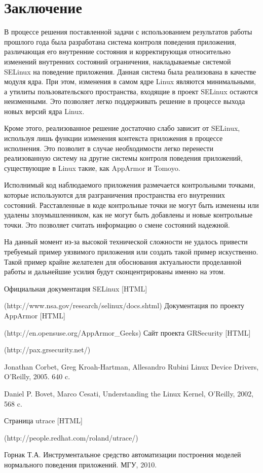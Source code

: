 \bigskip
\section {Заключение} 

В процессе решения поставленной задачи 
с использованием результатов работы прошлого 
года была разработана система контроля 
поведения приложения, различающая его 
внутренние состояния и корректирующая
относительно изменений внутренних состояний
ограничения, накладываемые системой SELinux
на поведение приложения. Данная система была 
реализована в качестве модуля ядра. При этом, 
изменения в самом ядре Linux являются минимальными, 
а утилиты пользовательского пространства, входящие
в проект SELinux остаются неизменными. Это позволяет 
легко поддерживать решение в процессе выхода новых 
версий ядра Linux. 

Кроме этого, реализованное решение достаточно 
слабо зависит от SELinux, используя лишь функции 
изменения контекста приложения в процессе исполнения.
Это позволит в случае необходимости легко 
перенести реализованную систему на другие системы 
контроля поведения приложений, существующие в Linux
такие, как AppArmor и Tomoyo.

Исполнимый код наблюдаемого приложения размечается 
контрольными точками, которые используются для 
разграничения пространства его внутренних состояний. 
Расставленные в коде контрольные точки не могут быть 
изменены или удалены злоумышленником, как не могут 
быть добавлены и новые контрольные точки. Это позволяет 
считать информацию о смене состояний надежной. 

На данный момент из-за высокой технической сложности 
не удалось привести требуемый пример уязвимого приложения 
или создать такой пример искуственно. Такой пример 
крайне желателен для обоснования актуальности проделанной
работы и дальнейшие усилия будут сконцентрированы именно 
на этом. 


\bigskip
\begin{thebibliography}{99}
Официальная документация SELinux [HTML] 

(http://www.nsa.gov/research/selinux/docs.shtml)
Документация по проекту AppArmor [HTML]

(http://en.opensuse.org/AppArmor\_Geeks)
Сайт проекта GRSecurity [HTML] 

(http://pax.grsecurity.net/)

Jonathan Corbet, Greg Kroah-Hartman, Allesandro Rubini Linux Device Drivers, O'Reilly, 2005. 640 c.

Daniel P. Bovet, Marco Cesati, Understanding the Linux Kernel, O'Reilly, 2002, 568 c.
 
Страница utrace [HTML] 

(http://people.redhat.com/roland/utrace/)

Горнак Т.А. Инструментальное средство автоматизации построения моделей
нормального поведения приложений. МГУ, 2010.

\end{thebibliography}
